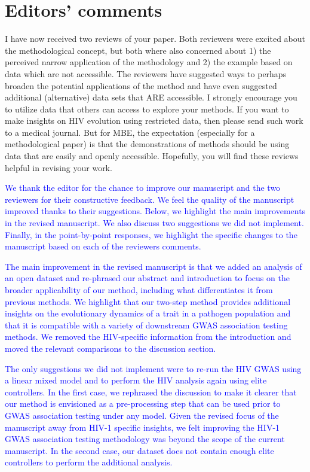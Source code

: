 \documentclass[11pt]{article}
\begin{document}
\newpage
\section*{Editors’ comments}
I have now received two reviews of your paper. Both reviewers were excited about the methodological concept, but both where also concerned about 1) the perceived narrow application of the methodology and 2) the example based on data which are not accessible. The reviewers have suggested ways to perhaps broaden the potential applications of the method and have even suggested additional (alternative) data sets that ARE accessible.  I strongly encourage you to utilize data that others can access to explore your methods. If you want to make insights on HIV evolution using restricted data, then please send such work to a medical journal. But for MBE, the expectation (especially for a methodological paper) is that the demonstrations of methods should be using data that are easily and openly accessible.  Hopefully, you will find these reviews helpful in revising your work.

\textcolor{blue}{We thank the editor for the chance to improve our manuscript and the two reviewers for their constructive feedback. We feel the quality of the manuscript improved thanks to their suggestions. Below, we highlight the main improvements in the revised manuscript. We also discuss two suggestions we did not implement. Finally, in the point-by-point responses, we highlight the specific changes to the manuscript based on each of the reviewers comments.}

\textcolor{blue}{The main improvement in the revised manuscript is that we added an analysis of an open dataset and re-phrased our abstract and introduction to focus on the broader applicability of our method, including what differentiates it from previous methods. We highlight that our two-step method provides additional insights on the evolutionary dynamics of a trait in a pathogen population and that it is compatible with a variety of downstream GWAS association testing methods. We removed the HIV-specific information from the introduction and moved the relevant comparisons to the discussion section.}

\textcolor{blue}{The only suggestions we did not implement were to re-run the HIV GWAS using a linear mixed model and to perform the HIV analysis again using elite controllers. In the first case, we rephrased the discussion to make it clearer that our method is envisioned as a pre-processing step that can be used prior to GWAS association testing under any model. Given the revised focus of the manuscript away from HIV-1 specific insights, we felt improving the HIV-1 GWAS association testing methodology was beyond the scope of the current manuscript. In the second case, our dataset does not contain enough elite controllers to perform the additional analysis.}
\end{document}
